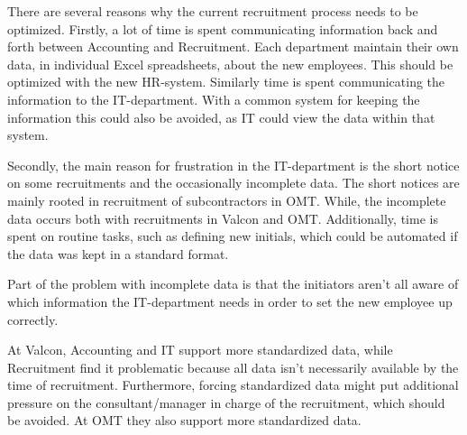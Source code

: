 There are several reasons why the current recruitment process needs to be optimized.
Firstly, a lot of time is spent communicating information back and forth between Accounting and Recruitment. 
Each department maintain their own data, in individual Excel spreadsheets, about the new employees. 
This should be optimized with the new HR-system.
Similarly time is spent communicating the information to the IT-department.
With a common system for keeping the information this could also be avoided, as IT could view the data within that system.

Secondly, the main reason for frustration in the IT-department is the short notice on some recruitments and the occasionally incomplete data.
The short notices are mainly rooted in recruitment of subcontractors in OMT.
While, the incomplete data occurs both with recruitments in Valcon and OMT.
Additionally, time is spent on routine tasks, such as defining new initials, which could be automated if the data was kept in a standard format.

Part of the problem with incomplete data is that the initiators aren't all aware of which information the IT-department needs in order to set the new employee up correctly.

At Valcon, Accounting and IT support more standardized data, while Recruitment find it problematic because all data isn't necessarily available by the time of recruitment.
Furthermore, forcing standardized data might put additional pressure on the consultant/manager in charge of the recruitment, which should be avoided.
At OMT they also support more standardized data.

